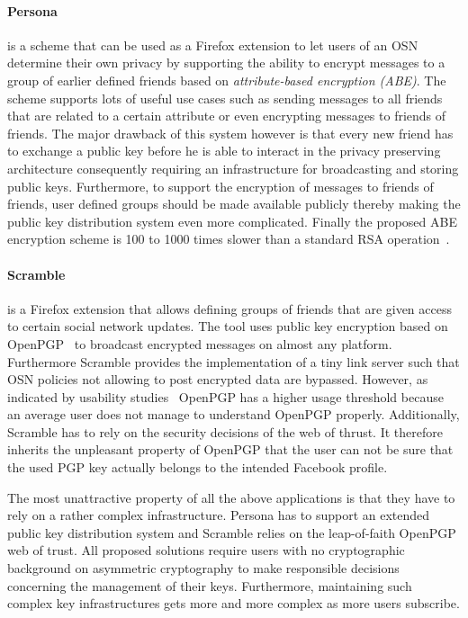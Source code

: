 \paragraph{Persona~\cite{art:BadenBSBS09}} is a scheme that can be used as a Firefox extension to let users of an OSN determine their own privacy by supporting the ability to encrypt messages to a group of earlier defined friends based on \textit{attribute-based encryption (ABE)}\cite{art:SahaiW04}. The scheme supports lots of useful use cases such as sending messages to all friends that are related to a certain attribute or even encrypting messages to friends of friends. The major drawback of this system however is that every new friend has to exchange a public key before he is able to interact in the privacy preserving architecture consequently requiring an infrastructure for broadcasting and storing public keys. Furthermore, to support the encryption of messages to friends of friends, user defined groups should be made available publicly thereby making the public key distribution system even more complicated. Finally the proposed ABE encryption scheme is 100 to 1000 times slower than a standard RSA operation~\cite{art:BadenBSBS09}.

\paragraph{Scramble~\cite{art:BeatoKW11}} is a Firefox extension that allows defining groups of friends that are given access to certain social network updates. The tool uses public key encryption based on OpenPGP~\cite{rfc4880} to broadcast encrypted messages on almost any platform. Furthermore Scramble provides the implementation of a tiny link server such that OSN policies not allowing to post encrypted data are bypassed. However, as indicated by usability studies~\cite{art:WhittenT99} OpenPGP has a higher usage threshold because an average user does not manage to understand OpenPGP properly. Additionally, Scramble has to rely on the security decisions of the web of thrust. It therefore inherits the unpleasant property of OpenPGP that the user can not be sure that the used PGP key actually belongs to the intended Facebook profile.

The most unattractive property of all the above applications is that they have to rely on a rather complex infrastructure. Persona has to support an extended public key distribution system and Scramble relies on the leap-of-faith OpenPGP web of trust. All proposed solutions require users with no cryptographic background on asymmetric cryptography to make responsible decisions concerning the management of their keys. Furthermore, maintaining such complex key infrastructures gets more and more complex as more users subscribe.

